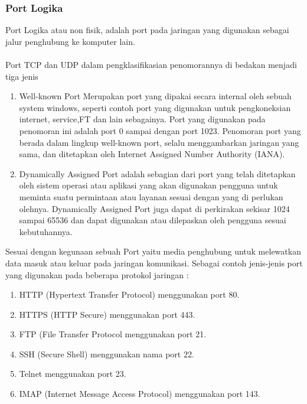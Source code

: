 \documentclass[12pt,a4paper]{article}
\begin{document}
\subsubsection {Port Logika}
Port Logika atau non fisik, adalah port pada jaringan yang digunakan sebagai jalur penghubung ke komputer lain. \\ \\
\hspace{1cm}
Port TCP dan UDP dalam pengklasifikasian penomorannya di bedakan menjadi tiga jenis
\begin{enumerate}
\item Well-known Port Merupakan port yang dipakai secara internal oleh sebuah system windows, seperti contoh port yang digunakan untuk pengkoneksian internet, service,FT dan lain sebagainya. Port yang digunakan pada penomoran ini adalah port 0 sampai dengan port 1023. Penomoran port yang berada dalam lingkup well-known port, selalu menggambarkan jaringan yang sama, dan ditetapkan oleh Internet Assigned Number Authority (IANA).
\item Dynamically Assigned Port adalah sebagian dari port yang telah ditetapkan oleh sistem operasi atau aplikasi yang akan digunakan pengguna untuk meminta suatu permintaan atau layanan sesuai dengan yang di perlukan olehnya. Dynamically Assigned Port juga dapat di perkirakan sekisar 1024 sampai 65536 dan dapat digunakan atau dilepaskan oleh pengguna sesuai kebutuhannya.
\end{enumerate} 
\hspace{1cm}
Sesuai dengan kegunaan sebuah Port yaitu media penghubung untuk melewatkan data masuk atau keluar pada jaringan komunikasi. Sebagai contoh jenis-jenis port yang digunakan pada beberapa protokol jaringan :\\
\begin{enumerate}
\item HTTP (Hypertext Transfer Protocol) menggunakan port 80.
\item HTTPS (HTTP Secure) menggunakan port 443.
\item FTP (File Transfer Protocol menggunakan port 21.
\item SSH (Secure Shell) menggunakan nama port 22.
\item Telnet menggunakan port 23.
\item IMAP (Internet Message Access Protocol) menggunakan port 143.
\end{enumerate}
\end{document}
